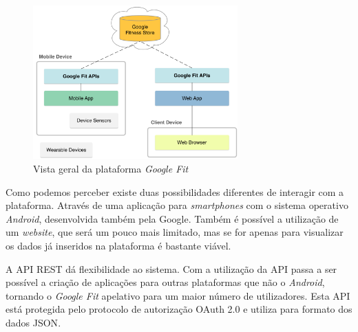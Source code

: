 \begin{figure}[!ht]
  \centering
  \includegraphics[width=0.7\textwidth]{imgs/googleFitOverview.png}
  \caption[Vista geral da plataforma \textit{Google Fit}]{Vista geral da plataforma \textit{Google Fit} \cite{googlefit}}
  
  \label{f:googleFitOverview}
\end{figure}

Como podemos perceber existe duas possibilidades diferentes de interagir com a plataforma. Através de uma aplicação para \textit{smartphones} com o sistema operativo \textit{Android}, desenvolvida também pela Google.  Também é possível a utilização de um \textit{website}, que será um pouco mais limitado, mas se for apenas para visualizar os dados já inseridos na plataforma é bastante viável.

A \gls{API} \gls{REST} dá flexibilidade ao sistema. Com a utilização da \gls{API} passa a ser possível a criação de aplicações para outras plataformas que não o \textit{Android}, tornando o \textit{Google Fit} apelativo para um maior número de utilizadores. Esta \gls{API} está protegida pelo protocolo de autorização OAuth 2.0 e utiliza para formato dos dados \gls{JSON}\cite{googlegetstarted}. 




